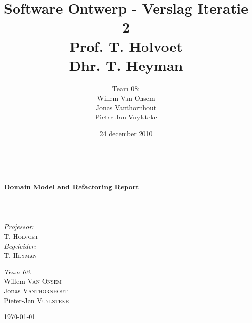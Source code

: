 \documentclass[a4paper,titlepage]{article}
\title{Software Ontwerp - Verslag Iteratie 2\\Prof. T. Holvoet\\Dhr. T. Heyman}
\author{Team 08:\\Willem Van Onsem\\Jonas Vanthornhout\\Pieter-Jan Vuylsteke}
\date{24 december 2010}
\newcommand{\HRule}{\rule{\linewidth}{0.5mm}}
\begin{document}
\begin{titlepage}
\begin{center}
\HRule \\[0.4cm]
{ \huge \bfseries Domain Model and Refactoring Report}\\[0.4cm]
\HRule \\[1.5cm]
\begin{minipage}{0.4\textwidth}
\begin{flushleft} \large
\emph{Professor:}\\
T. \textsc{Holvoet}\\
\emph{Begeleider:}\\
T. \textsc{Heyman}
\end{flushleft}
\end{minipage}
\begin{minipage}{0.4\textwidth}
\begin{flushright} \large
\emph{Team 08:} \\
Willem \textsc{Van Onsem}\\
Jonas \textsc{Vanthornhout}\\
Pieter-Jan \textsc{Vuylsteke}
\end{flushright}
\end{minipage}

\vfill

{\large \today}
\end{center}
\end{titlepage}
\tableofcontents



\end{document}
